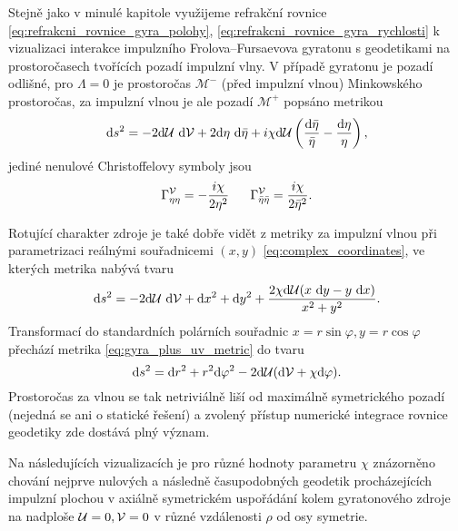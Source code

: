 Stejně jako v minulé kapitole využijeme refrakční rovnice \eqref{eq:refrakcni_rovnice_gyra_polohy}, \eqref{eq:refrakcni_rovnice_gyra_rychlosti}
k vizualizaci interakce impulzního Frolova--Fursaevova gyratonu s geodetikami na prostoročasech tvořících pozadí impulzní vlny.
V případě gyratonu je pozadí odlišné, pro $\Lambda = 0$ je prostoročas $\mathcal{M}^{-}$ (před impulzní vlnou) Minkowského prostoročas,
za impulzní vlnou je ale pozadí $\mathcal{M}^+$ popsáno metrikou
\begin{equation}
    \mathrm{d} s^2 = - 2 \mathrm{d} \mathcal{U} ~ \mathrm{d} \mathcal{V} + 2 \mathrm{d} \eta ~ \mathrm{d} \bar{\eta} + i \chi \mathrm{d} \mathcal{U} \left(\frac{\mathrm{d} \bar{\eta}}{\bar{\eta}} - \frac{\mathrm{d} \eta}{\eta}\right),
\end{equation}
jediné nenulové Christoffelovy symboly jsou
\begin{equation}
    \Gamma^{\mathcal{V}}_{\eta \eta} = - \frac{i \chi}{2 \eta^2} ~~~~~ \Gamma^{\mathcal{V}}_{\bar{\eta}\bar{\eta}} = \frac{i \chi}{2 \bar{\eta}^2}.
\end{equation}

Rotující charakter zdroje je také dobře vidět z metriky za impulzní vlnou při parametrizaci reálnými souřadnicemi $(x, y)$ \eqref{eq:complex_coordinates},
ve kterých metrika nabývá tvaru
\begin{equation}
    \label{eq:gyra_plus_uv_metric}
    \mathrm{d} s^2 = -2 \mathrm{d} \mathcal{U} ~ \mathrm{d} \mathcal{V} + \mathrm{d} x^2 + \mathrm{d} y^2 + \frac{2 \chi \mathrm{d} \mathcal{U} (x~\mathrm{d} y - y~\mathrm{d} x)}{x^2 + y^2}.
\end{equation}
Transformací do standardních polárních souřadnic $x = r \sin{\varphi}, y = r \cos{\varphi}$ přechází metrika \eqref{eq:gyra_plus_uv_metric} do tvaru
\begin{equation}
    \mathrm{d} s^2 = \mathrm{d} r^2 + r^2 \mathrm{d} \varphi^2 - 2 \mathrm{d} \mathcal{U} (\mathrm{d} \mathcal{V} + \chi \mathrm{d} \varphi).
\end{equation}
Prostoročas za vlnou se tak netriviálně liší od maximálně symetrického pozadí (nejedná se ani o statické řešení) a zvolený přístup
numerické integrace rovnice geodetiky zde dostává plný význam.

Na následujících vizualizacích je pro různé hodnoty parametru $\chi$ znázorněno chování nejprve nulových a následně časupodobných geodetik procházejících impulzní plochou v
axiálně symetrickém uspořádání kolem gyratonového zdroje na nadploše $\mathcal{U} = 0, \mathcal{V}=0$ v různé vzdálenosti $\rho$ od osy symetrie.

